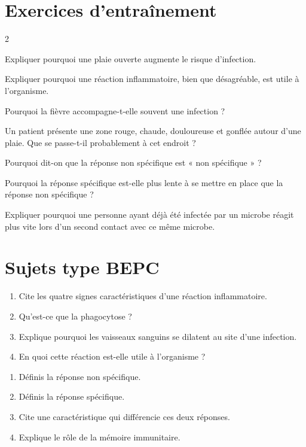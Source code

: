 \section{Exercices d'entraînement}
\begin{multicols}{2}

\exo{} Expliquer pourquoi une plaie ouverte augmente le risque
d'infection.

\exo{} Expliquer pourquoi une réaction inflammatoire, bien que désagréable, est
utile à l'organisme.

\exo{} Pourquoi la fièvre accompagne-t-elle souvent une infection ?

\exo{} Un patient présente une zone rouge, chaude, douloureuse et gonflée
autour d'une plaie. Que se passe-t-il probablement à cet endroit ?

\exo{} Pourquoi dit-on que la réponse non spécifique est « non spécifique » ?

\exo{} Pourquoi la réponse spécifique est-elle plus lente à se mettre en place
que la réponse non spécifique ?

\exo{} Expliquer pourquoi une personne ayant déjà été infectée par un microbe
réagit plus vite lors d'un second contact avec ce même microbe.

\end{multicols}

\section{Sujets type BEPC}

\begin{enumerate}[label=\arabic*)]
\item Cite les quatre signes caractéristiques d'une réaction inflammatoire.
\item Qu'est-ce que la phagocytose ?
\item Explique pourquoi les vaisseaux sanguins se dilatent au site d'une infection.
\item En quoi cette réaction est-elle utile à l'organisme ?
\end{enumerate}

\begin{enumerate}[label=\arabic*)]
\item Définis la réponse non spécifique.
\item Définis la réponse spécifique.
\item Cite une caractéristique qui différencie ces deux réponses.
\item Explique le rôle de la mémoire immunitaire.
\end{enumerate}

